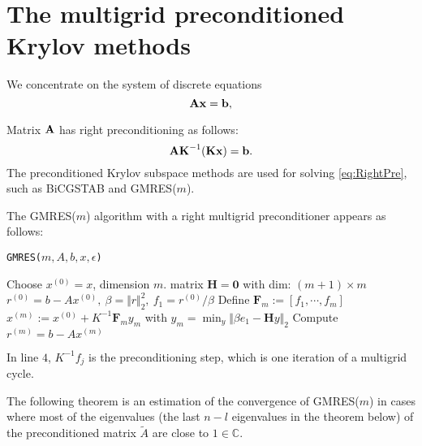 
\section{The multigrid preconditioned Krylov methods}
\label{sec:MGPre}

We concentrate on the system of discrete equations
\begin{equation}
  \label{eq:AX=B}
  {\mathbf{A}}{\mathbf{x}}={\mathbf{b}},
\end{equation}

Matrix ${\mathbf{A}}$ has right preconditioning as follows:
\begin{equation}
  \label{eq:RightPre}
  \mathbf{AK}^{-1}(\mathbf{Kx})={\mathbf{b}}.
\end{equation}
The preconditioned Krylov subspace methods are used for solving
\eqref{eq:RightPre}, such as BiCGSTAB and GMRES($m$).

\begin{alg}
  The GMRES($m$) algorithm with a right multigrid preconditioner
  appears as follows:

 \IncMargin{1em}
 \LinesNumbered
 \begin{algorithm}[H]

   \caption{\texttt{GMRES($m,A,b,x,\epsilon$)}}
   \BlankLine
   Choose $x^{(0)}=x$, dimension $m$. matrix $\mathbf{H}=\mathbf{0}$
   with dim: $(m+1)\times m$\;
   $r^{(0)}=b-Ax^{(0)},\ \beta=\Vert r\Vert_2^2,\ f_1=r^{(0)}/\beta$\;
   Define $\mathbf{F}_m := [f_1,\cdots,f_m]$\;
   $x^{(m)}:=x^{(0)} + K^{-1}\mathbf{F}_my_m$ with $y_m=\min_y\Vert
   \beta e_1-\mathbf{H}y \Vert_2$\;
   Compute $r^{(m)}=b-Ax^{(m)}$\;
 \end{algorithm}
 \DecMargin{1em}
 In line $4$, $K^{-1}f_j$ is the preconditioning step, which is one
 iteration of a multigrid cycle.
\end{alg}

The following theorem is an estimation of the convergence of
GMRES($m$) in cases where most of the eigenvalues (the last $n-l$
eigenvalues in the theorem below) of the preconditioned matrix
$\tilde{A}$ are close to $1\in\mathbb{C}.$

